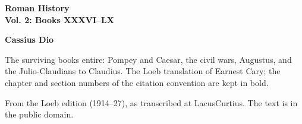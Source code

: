 \documentclass[11pt,letterpaper]{article}
\begin{document}
\color{ink}

\begin{titlepage}
\centering
\vspace*{4em}
{\LARGE\bfseries\color{heading} Roman History\\[0.3em]Vol. 2: Books XXXVI--LX\par}
\vspace{2em}
{\Large\bfseries\color{heading} Cassius Dio\par}
\vspace{2.5em}
{\itshape\color{subhead}\parbox{0.8\linewidth}{\centering The surviving books entire: Pompey and Caesar, the civil wars, Augustus, and the Julio-Claudians to Claudius. The Loeb translation of Earnest Cary; the chapter and section numbers of the citation convention are kept in bold.\par}}
\vfill
{\small From the Loeb edition (1914--27), as transcribed at LacusCurtius. The text is in the public domain.\par}
\vspace{2em}
\end{titlepage}

\tableofcontents


\end{document}
